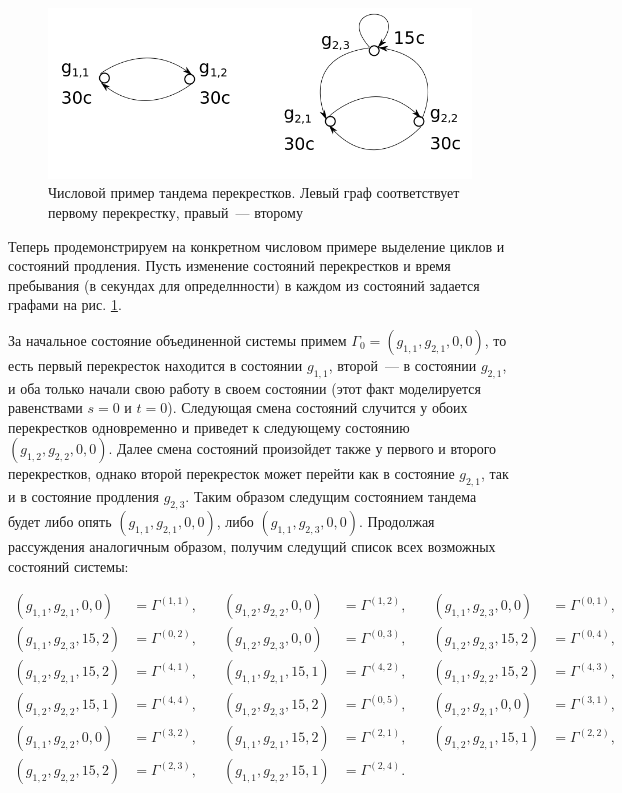 \documentclass[12pt]{extarticle}
\theoremstyle{theorem}
\theoremstyle{remark}
\begin{document}
\begin{figure}[t]
\includegraphics[scale=0.5]{SystemStates.png} 
\caption{Числовой пример тандема перекрестков. Левый граф соответствует первому перекрестку, правый~--- второму}
\label{SystemStates}
\end{figure}

Теперь продемонстрируем на конкретном числовом примере выделение циклов и состояний продления. Пусть изменение состояний перекрестков и время пребывания (в секундах для определнности) в каждом из состояний задается графами на рис. \ref{SystemStates}.



За начальное состояние объединенной системы примем $\Gamma_0=(g_{1,1},g_{2,1},0,0)$, то есть первый перекресток находится в состоянии $g_{1,1}$, второй~--- в состоянии $g_{2,1}$, и оба только начали свою работу в своем состоянии (этот факт моделируется равенствами $s=0$ и $t=0$). Следующая смена состояний случится у обоих перекрестков одновременно и приведет к следующему состоянию $(g_{1,2},g_{2,2}, 0, 0)$. Далее смена состояний произойдет также у первого и второго перекрестков, однако второй перекресток может перейти как в состояние $g_{2,1}$, так и в состояние продления $g_{2,3}$. Таким образом следущим состоянием тандема будет либо опять $(g_{1,1},g_{2,1},0,0)$, либо $(g_{1,1},g_{2,3},0,0)$. Продолжая рассуждения аналогичным образом, получим следущий список всех возможных состояний системы:

\begin{align*}
(g_{1,1},g_{2,1},0,0)&=\Gamma^{(1,1)} ,& \quad (g_{1,2},g_{2,2},0,0)&=\Gamma^{(1,2)} ,& \quad (g_{1,1},g_{2,3},0,0)&=\Gamma^{(0,1)}, \\
(g_{1,1},g_{2,3},15,2)&=\Gamma^{(0,2)} ,& \quad (g_{1,2},g_{2,3},0,0)&=\Gamma^{(0,3)} ,& \quad (g_{1,2},g_{2,3},15,2)&=\Gamma^{(0,4)}, \\
(g_{1,2},g_{2,1},15,2)&=\Gamma^{(4,1)} ,& \quad (g_{1,1},g_{2,1},15,1)&=\Gamma^{(4,2)} ,& \quad (g_{1,1},g_{2,2},15,2)&=\Gamma^{(4,3)}, \\
(g_{1,2},g_{2,2},15,1)&=\Gamma^{(4,4)} ,& \quad (g_{1,2},g_{2,3},15,2)&=\Gamma^{(0,5)} ,& \quad (g_{1,2},g_{2,1},0,0)&=\Gamma^{(3,1)}, \\
(g_{1,1},g_{2,2},0,0)&=\Gamma^{(3,2)} ,& \quad (g_{1,1},g_{2,1},15,2)&=\Gamma^{(2,1)} ,& \quad (g_{1,2},g_{2,1},15,1)&=\Gamma^{(2,2)}, \\
(g_{1,2},g_{2,2},15,2)&=\Gamma^{(2,3)} ,& \quad (g_{1,1},g_{2,2},15,1)&=\Gamma^{(2,4)}. & &
\end{align*}
\end{document}
